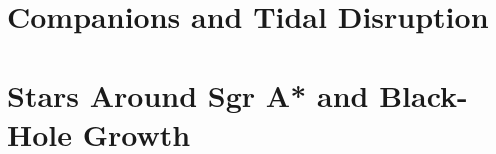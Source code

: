 \section{Companions and Tidal Disruption}\label{sec:companions-and-tidal-disruption}

\section{Stars Around Sgr A* and Black-Hole Growth\optmark}\label{sec:stars-around-sgr-a-and-black-hole-growth}
